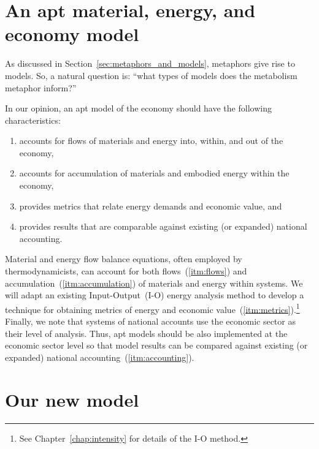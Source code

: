 \section{An apt material, energy, and economy model}
\label{sec:apt_models}

As discussed in Section~\ref{sec:metaphors_and_models}, 
metaphors give rise to models.
So, a natural question is: 
``what types of models does the metabolism metaphor inform?''

In our opinion, an apt model of the economy should have the following characteristics:

\begin{enumerate}
	\item{\label{itm:flows}accounts for flows of materials and energy 
			into, within, and out of the economy,}
	\item{\label{itm:accumulation}accounts for accumulation of materials and embodied energy 
			within the economy,}
	\item{\label{itm:metrics}provides metrics that relate energy demands and economic value, and}
	\item{\label{itm:accounting}provides results that are comparable against existing 
			(or expanded) national accounting.}
\end{enumerate}

Material and energy flow balance equations, 
often employed by thermodynamicists, 
can account for both flows~(\ref{itm:flows}) and accumulation~(\ref{itm:accumulation}) 
of materials and energy within systems.
We will adapt an existing Input-Output~(I-O)
energy analysis method to develop a 
technique for obtaining metrics 
of energy and economic value~(\ref{itm:metrics}).\footnote{See Chapter~\ref{chap:intensity}
for details of the I-O method.}
Finally, we note that systems of national accounts use the economic sector
as their level of analysis. 
Thus, apt models should be also implemented at the economic sector level
so that model results can be 
compared against existing (or expanded) national accounting~(\ref{itm:accounting}).


\section{Our new model}
\label{sec:our_new_model}

%
%
%

